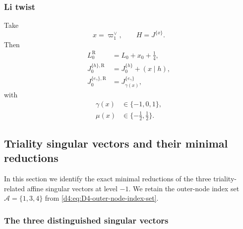 \documentclass[11pt,reqno]{amsart}
\theoremstyle{definition}
\theoremstyle{remark}
\begin{document}
\subsubsection{Li twist}
\label{d4:subsec:D4-Li-delta-operator}
Take
\begin{equation}
 x=\varpi_1^\vee,\qquad H=J^{\{x\}}.
 \label{d4:eq:D4-Li-choice-x}
\end{equation}
Then
\begin{align}
 L_0^{\mathrm R}&=L_0+x_0+\frac14,
 \label{d4:eq:D4-Li-Ramond-Hamiltonian}\\
 J_0^{\{h\},\mathrm R}&=J_0^{\{h\}}+(x\mid h),
 \label{d4:eq:D4-Li-Cartan-shift}\\
 J_0^{\{e_\gamma\},\mathrm R}&=J_{\gamma(x)}^{\{e_\gamma\}},
 \label{d4:eq:D4-Li-root-mode-shift}
\end{align}
with
\begin{align}
 \gamma(x)&\in\{-1,0,1\},
 \label{d4:eq:D4-Li-current-charges}\\
 \mu(x)&\in\{-\tfrac12,\tfrac12\}.
 \label{d4:eq:D4-Li-half-space-charges}
\end{align}

\subsection{Triality singular vectors and their minimal reductions}
\label{d4:sec:D4-triality-singular-vectors}

In this section we identify the exact minimal reductions of the three
triality-related affine singular vectors at level \(-1\).  We retain the
outer-node index set
\(\mathcal A=\{1,3,4\}\) from
\eqref{d4:eq:D4-outer-node-index-set}.

\subsubsection{The three distinguished singular vectors}
\end{document}
